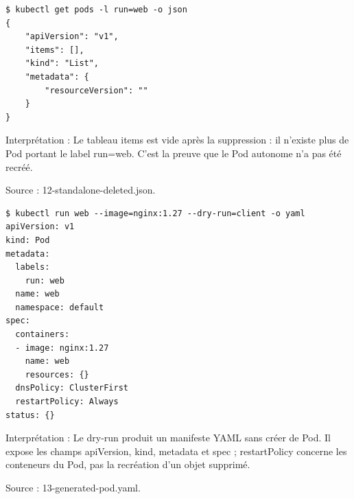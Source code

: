 \documentclass[11pt,a4paper]{article}
\begin{document}
\par\medskip\noindent\begin{minipage}{\linewidth}
\par\vspace{4pt}\noindent\begin{minipage}{\linewidth}
\begin{Verbatim}[breaklines=true,breakanywhere=true,fontsize=\footnotesize,frame=single,framesep=8pt,rulecolor=\color{teal}]
$ kubectl get pods -l run=web -o json
{
    "apiVersion": "v1",
    "items": [],
    "kind": "List",
    "metadata": {
        "resourceVersion": ""
    }
}
\end{Verbatim}
\end{minipage}\par\vspace{6pt}

Interprétation : Le tableau items est vide après la suppression : il n'existe plus de Pod portant le label run=web. C'est la preuve que le Pod autonome n'a pas été recréé.

{\footnotesize\color{teal} Source : 12-standalone-deleted.json.\par}
\end{minipage}\par\medskip

\par\medskip\noindent\begin{minipage}{\linewidth}
\par\vspace{4pt}\noindent\begin{minipage}{\linewidth}
\begin{Verbatim}[breaklines=true,breakanywhere=true,fontsize=\footnotesize,frame=single,framesep=8pt,rulecolor=\color{teal}]
$ kubectl run web --image=nginx:1.27 --dry-run=client -o yaml
apiVersion: v1
kind: Pod
metadata:
  labels:
    run: web
  name: web
  namespace: default
spec:
  containers:
  - image: nginx:1.27
    name: web
    resources: {}
  dnsPolicy: ClusterFirst
  restartPolicy: Always
status: {}
\end{Verbatim}
\end{minipage}\par\vspace{6pt}

Interprétation : Le dry-run produit un manifeste YAML sans créer de Pod. Il expose les champs apiVersion, kind, metadata et spec ; restartPolicy concerne les conteneurs du Pod, pas la recréation d'un objet supprimé.

{\footnotesize\color{teal} Source : 13-generated-pod.yaml.\par}
\end{minipage}\par\medskip
\end{document}
